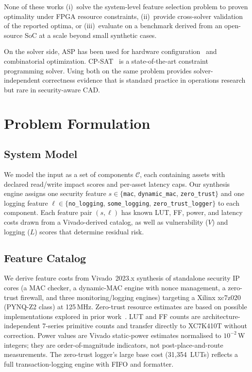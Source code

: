\documentclass[conference]{IEEEtran}
\begin{document}
None of these works (i)~solve the system-level feature selection problem
to proven optimality under FPGA resource constraints, (ii)~provide
cross-solver validation of the reported optima, or (iii)~evaluate on a benchmark derived
from an open-source SoC at a scale beyond small synthetic cases.

On the solver side, ASP has been used for hardware
configuration~\cite{gebser_potassco_2011} and combinatorial
optimization. CP-SAT~\cite{ortools} is a state-of-the-art constraint
programming solver. Using both on the same problem provides
solver-independent correctness evidence that is standard practice in
operations research but rare in security-aware CAD.

\section{Problem Formulation}

\subsection{System Model}

We model the input as a set of components $\mathcal{C}$, each containing
assets with declared read/write impact scores and per-asset latency caps.
Our synthesis engine assigns one security feature $s \in
\{$\texttt{mac}, \texttt{dynamic\_mac}, \texttt{zero\_trust}$\}$ and
one logging feature $\ell \in \{$\texttt{no\_logging},
\texttt{some\_logging}, \texttt{zero\_trust\_logger}$\}$ to each
component. Each feature pair $(s, \ell)$ has known LUT, FF,
power, and latency costs drawn from a Vivado-derived catalog, as well as
vulnerability ($V$) and logging ($L$) scores that determine residual
risk.

\subsection{Feature Catalog}

We derive feature costs from Vivado~2023.x synthesis of standalone
security IP cores (a MAC checker, a dynamic-MAC engine with nonce
management, a zero-trust firewall, and three monitoring/logging
engines) targeting a Xilinx xc7z020 (PYNQ-Z2 class) at 125\,MHz.
Zero-trust resource estimates are based on possible implementations
explored in prior work~\cite{butka_measuring_2025}. LUT and FF counts
are architecture-independent 7-series primitive counts and transfer
directly to XC7K410T without correction. Power values are Vivado
static-power estimates normalised to $10^{-2}$\,W integers; they are
order-of-magnitude indicators, not post-place-and-route measurements.
The zero-trust logger's large base cost (31{,}354~LUTs) reflects a
full transaction-logging engine with FIFO and formatter.
\end{document}
